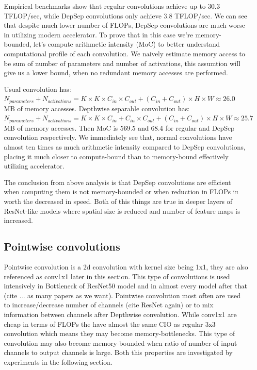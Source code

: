 Empirical benchmarks show that regular convolutions achieve up to 30.3 TFLOP/sec, while DepSep convolutions only achieve 3.8 TFLOP/sec. We can see that despite much lower number of FLOPs, DepSep convolutions are much worse in utilizing modern accelerator. To prove that in this case we're memory-bounded, let's compute arithmetic intensity (MoC) to better understand computational profile of each convolution. We naively estimate memory access to be sum of number of parameters and number of activations, this assumtion will give us a lower bound, when no redundant memory accesses are performed. 


Usual convolution has: $ N_{parameters} + N_{activations} = K \times K \times C_{in} \times C_{out} + (C_{in} + C_{out}) \times H \times W \approx 26.0$ MB of memory accesses. Depthwise separable convolution has: $ N_{parameters} + N_{activations} = K \times K \times C_{in} + C_{in} \times C_{out} + (C_{in} + C_{out}) \times H \times W \approx 25.7$ MB of memory accesses. Then MoC is 569.5 and 68.4 for regular and DepSep convolution respectively. We immediately see that, normal convolutions have almost ten times as much arithmetic intensity compared to DepSep convolutions, placing it much closer to compute-bound than to memory-bound effectively utilizing accelerator. 

The conclusion from above analysis is that DepSep convolutions are efficient when computing them is not memory-bounded or when reduction in FLOPs in worth the decreased in speed. Both of this things are true in deeper layers of ResNet-like models where spatial size is reduced and number of feature maps is increased. 

\subsection{Pointwise convolutions}

Pointwise convolution is a 2d convolution with kernel size being 1x1, they are also referenced as conv1x1 later in this section. This type of convolutions is used intensively in Bottleneck of ResNet50 model and in almost every model after that (cite ... as many papers as we want). Pointwise convolution most often are used to increase/decrease number of channels (cite ResNet again) or to mix information between channels after Depthwise convolution. While conv1x1 are cheap in terms of FLOPs the have almost the same CIO as regular 3x3 convolution which means they may become memory-bottlenecks. This type of convolution may also become memory-bounded when ratio of number of input channels to output channels is large. Both this properties are investigated by experiments in the following section.

